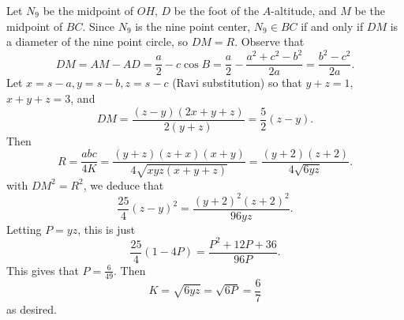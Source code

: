 Let $N_9$ be the midpoint of $OH$, $D$ be the foot of the $A$-altitude, and $M$ be the midpoint of $BC$. Since $N_9$ is the nine point center, $N_9\in BC$ if and only if $DM$ is a diameter of the nine point circle, so $DM=R$. Observe that \[DM=AM-AD=\frac{a}{2}-c\cos B=\frac{a}{2}-\frac{a^2+c^2-b^2}{2a}=\frac{b^2-c^2}{2a}.\] Let $x=s-a,y=s-b,z=s-c$ (Ravi substitution) so that $y+z=1$, $x+y+z=3$, and \[DM=\frac{\left(z-y\right)\left(2x+y+z\right)}{2\left(y+z\right)}=\frac{5}{2}\left(z-y\right).\] Then \[R=\frac{abc}{4K}=\frac{\left(y+z\right)\left(z+x\right)\left(x+y\right)}{4\sqrt{xyz\left(x+y+z\right)}}=\frac{\left(y+2\right)\left(z+2\right)}{4\sqrt{6yz}}.\] with $DM^2=R^2$, we deduce that \[\frac{25}{4}\left(z-y\right)^2=\frac{\left(y+2\right)^2\left(z+2\right)^2}{96yz}.\] Letting $P=yz$, this is just \[\frac{25}{4}\left(1-4P\right)=\frac{P^2+12P+36}{96P}.\] This gives that $P=\frac{6}{49}$. Then \[K=\sqrt{6yz}=\sqrt{6P}=\boxed{\frac{6}{7}}\] as desired.